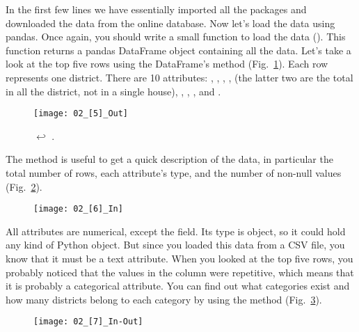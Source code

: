 In the first few lines we have essentially imported all the packages and downloaded the data from the online database. Now let's load the data using pandas. Once again, you should write a small function to load the data (). This function returns a pandas DataFrame object containing all the data. Let's take a look at the top five rows using the DataFrame's  method (Fig.~\ref{02_[5]_Out}). Each row represents one district. There are 10 attributes: , , , ,  (the latter two are the total in all the district, not in a single house), , , ,  and .
\begin{figure}[h!t]
\centering
\vspace{1pt}\texttt{[image: 02\_[5]\_Out]}
\caption{ $\hookleftarrow$ .}\label{02_[5]_Out}
\end{figure}

The  method is useful to get a quick description of the data, in particular the total number of rows, each attribute's type, and the number of non-null values (Fig.~\ref{02_[6]_In}).
\begin{figure}[h!t]
\centering
\texttt{[image: 02\_[6]\_In]}
\caption{}\label{02_[6]_In}
\end{figure}

All attributes are numerical, except the  field. Its type is object, so it could hold any kind of Python object. But since you loaded this data from a CSV file, you know that it must be a text attribute. When you looked at the top five rows, you probably noticed that the values in the  column were repetitive, which means that it is probably a categorical attribute. You can find out what categories exist and how many districts belong to each category by using the  method (Fig.~\ref{02_[7]_In-Out}).
\begin{figure}[h!t]
\centering
\texttt{[image: 02\_[7]\_In-Out]}
\caption{}\label{02_[7]_In-Out}
\end{figure}

